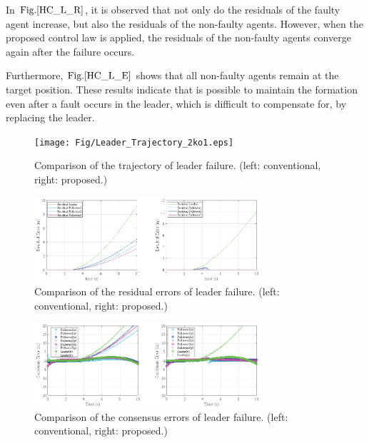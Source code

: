 \documentclass[a4paper,fleqn,10pt,twocolumn]{SICE_ISCS}
\begin{document}
In \(\text{Fig.} \ref{HC_L_R}\), it is observed that not only do the residuals of the faulty agent increase, but also the residuals of the non-faulty agents. However, when the proposed control law is applied, the residuals of the non-faulty agents converge again after the failure occurs. 

Furthermore, \(\text{Fig.} \ref{HC_L_E}\) shows that all non-faulty agents remain at the target position. These results indicate that is possible to maintain the formation even after a fault occurs in the leader, which is difficult to compensate for, by replacing the leader.


\begin{figure}[b]
	\begin{center}
		\texttt{[image: Fig/Leader\_Trajectory\_2ko1.eps]}
		\caption{Comparison of the trajectory of leader failure. (left: conventional, right: proposed.)}
		\label{HC_L_T}
	\end{center}
	\vspace{-2mm}
\end{figure}

\begin{figure}[b]
	\begin{center}
		\includegraphics[clip,width=84mm]{Fig/Leader_Residual_2ko1.eps}
		\caption{Comparison of the residual errors of leader failure. (left: conventional, right: proposed.)}
		\label{HC_L_R}
	\end{center}
	\vspace{-2mm}
\end{figure}

\begin{figure}[b]
	\begin{center}
		\includegraphics[clip,width=84mm]{Fig/Leader_Consensus_2ko1.eps}
		\caption{Comparison of the consensus errors of leader failure. (left: conventional, right: proposed.)}
		\label{HC_L_E}
	\end{center}
	\vspace{-3mm}
\end{figure}
\end{document}

